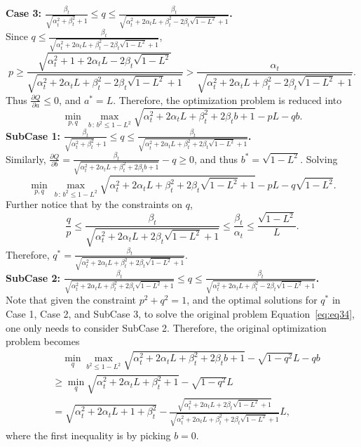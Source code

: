 {\bf Case 3: $\frac{\beta_t}{\sqrt{\alpha_t^2+\beta_t^2}+1} \le q \le \frac{\beta_t}{\sqrt{\alpha_t^2+2\alpha_tL + \beta_t^2 - 2\beta_t\sqrt{1-L^2} + 1}}$.} \\

Since $q \le \frac{\beta_t}{\sqrt{\alpha_t^2+2\alpha_tL + \beta_t^2 - 2\beta_t\sqrt{1-L^2} + 1}}$, 
\[p \ge \frac{\sqrt{\alpha_t^2+1+2\alpha_tL  - 2\beta_t\sqrt{1-L^2}}}{\sqrt{\alpha_t^2+2\alpha_tL + \beta_t^2 - 2\beta_t\sqrt{1-L^2} + 1}}
>\frac{\alpha_t}{\sqrt{\alpha_t^2+2\alpha_tL + \beta_t^2 - 2\beta_t\sqrt{1-L^2} + 1}}.
\]
Thus $\frac{\partial Q}{\partial a} \le 0$, and $a^* = L$. Therefore, the optimization problem is reduced into 
\[
\min_{p,q}\, \max_{b\,:\, b^2\le 1-L^2} \sqrt{\alpha_t^2+2\alpha_tL + \beta_t^2+2\beta_tb + 1} -pL -qb.
\]
{\bf SubCase 1: $\frac{\beta_t}{\sqrt{\alpha_t^2+\beta_t^2}+1} \le q \le \frac{\beta_t}{\sqrt{\alpha_t^2+2\alpha_tL + \beta_t^2 + 2\beta_t\sqrt{1-L^2} + 1}}$.} \\
Similarly, $\frac{\partial Q}{\partial b} = \frac{\beta_t}{\sqrt{\alpha_t^2+2\alpha_tL + \beta_t^2+2\beta_tb + 1}} - q \ge 0$, and thus $b^* = \sqrt{1-L^2}$. Solving 
\[
\min_{p,q}\, \max_{b\,:\, b^2\le 1-L^2} \sqrt{\alpha_t^2+2\alpha_tL + \beta_t^2+2\beta_t\sqrt{1-L^2} + 1} -pL -q\sqrt{1-L^2}.
\]
Further notice that by the constraints on $q$, 
\[
\frac{q}{p} \le \frac{\beta_t}{\sqrt{\alpha_t^2+2\alpha_tL + 2\beta_t\sqrt{1-L^2} + 1}}
\le \frac{\beta_t}{\alpha_t} \le \frac{\sqrt{1-L^2}}{L}.
\]
Therefore, $q^* = \frac{\beta_t}{\sqrt{\alpha_t^2+2\alpha_tL + \beta_t^2 + 2\beta_t\sqrt{1-L^2} + 1}}$. \\
{\bf SubCase 2: $\frac{\beta_t}{\sqrt{\alpha_t^2+2\alpha_tL + \beta_t^2 + 2\beta_t\sqrt{1-L^2} + 1}} \le q \le \frac{\beta_t}{\sqrt{\alpha_t^2+2\alpha_tL + \beta_t^2 - 2\beta_t\sqrt{1-L^2} + 1}}$.} \\
Note that given the constraint $p^2+q^2=1$, and the optimal solutions for $q^*$ in Case 1, Case 2, and SubCase 3, to solve the original problem Equation~\eqref{eq:eq34}, one only needs to consider SubCase 2.
Therefore, the original optimization problem becomes
\begin{align*}
& \quad \min_q \max_{b^2\le 1-L^2} \sqrt{\alpha_t^2+2\alpha_tL + \beta_t^2+2\beta_tb + 1} -\sqrt{1-q^2}L -qb \\ 
& \ge \min_q \sqrt{\alpha_t^2+2\alpha_tL + \beta_t^2 + 1} -\sqrt{1-q^2}L \\
& = \sqrt{\alpha_t^2 + 2\alpha_tL + 1+\beta_t^2} - \frac{\sqrt{\alpha_t^2+2\alpha_tL + 2\beta_t\sqrt{1-L^2} + 1}}{\sqrt{\alpha_t^2+2\alpha_tL + \beta_t^2 + 2\beta_t\sqrt{1-L^2} + 1}}L,
\end{align*}
where the first inequality is by picking $b=0$.

